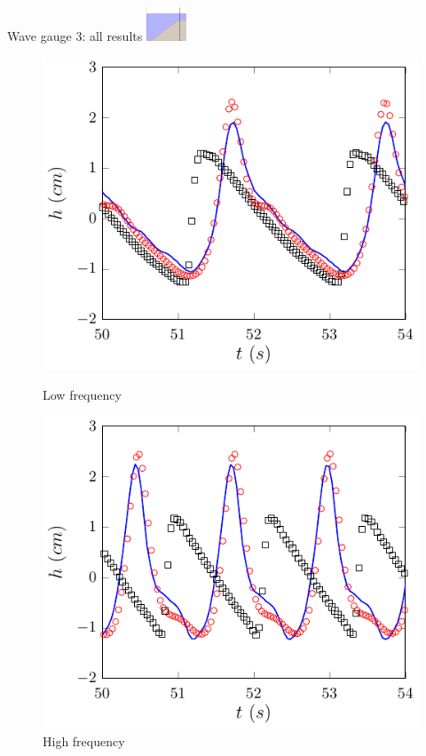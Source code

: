 \documentclass[pdf]{beamer}
\begin{document}
\begin{frame}{Wave gauge 3: all results \space\space	\includegraphics[width=1.2cm]{./Pics/WT3z.pdf}  }
	\begin{figure}
		\centering
		\begin{minipage}{.5\textwidth}
			\centering
			\includegraphics[width=0.9\linewidth]{./Pics/SL/WG3/1-figure0.pdf}
			\caption{Low frequency}
		\end{minipage}%
		\begin{minipage}{.5\textwidth}
			\centering
			\includegraphics[width=0.9\linewidth]{./Pics/SH/WG3/1-figure0.pdf}
			\caption{High frequency}
		\end{minipage}
	\end{figure}
\end{frame}
\end{document}
